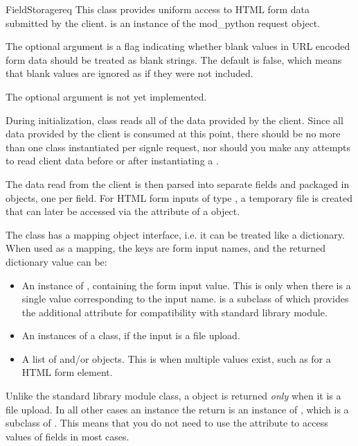 \begin{classdesc}{FieldStorage}{req}
  This class provides uniform access to HTML form data submitted by the
  client.   is an instance of the mod_python request object.

  The optional argument  is a flag indicating
  whether blank values in URL encoded form data should be treated as
  blank strings. The default is false, which means that blank values are
  ignored as if they were not included.

  The optional argument  is not yet implemented.

  During initialization,  class reads all of the
  data provided by the client. Since all data provided by the client is
  consumed at this point, there should be no more than one
   class instantiated per signle request, nor should
  you make any attempts to read client data before or after
  instantiating a .

  The data read from the client is then parsed into separate fields and
  packaged in  objects, one per field. For HTML form inputs
  of type , a temporary file is created that can later be
  accessed via the  attribute of a  object.

  The  class has a mapping object interface, i.e. it
  can be treated like a dictionary. When used as a mapping, the keys are
  form input names, and the returned dictionary value can be:

  \begin{itemize}
  \item
    An instance of , containing the form input
    value. This is only when there is a single value corresponding to the
    input name.  is a subclass of  which
    provides the additional  attribute for compatibility
    with standard library  module.
  \item
    An instances of a  class, if the input is a file upload.
  \item
    A list of  and/or  objects. This is
    when multiple values exist, such as for a  HTML form
    element.
  \end{itemize}

  \begin{notice}
    Unlike the standard library  module
     class, a  object is returned
    \emph{only} when it is a file upload. In all other cases an instance
    the return is an instance of , which is a subclass
    of . This means that you do not need to use the
     attribute to access values of fields in most cases.
  \end{notice}


\end{classdesc}
